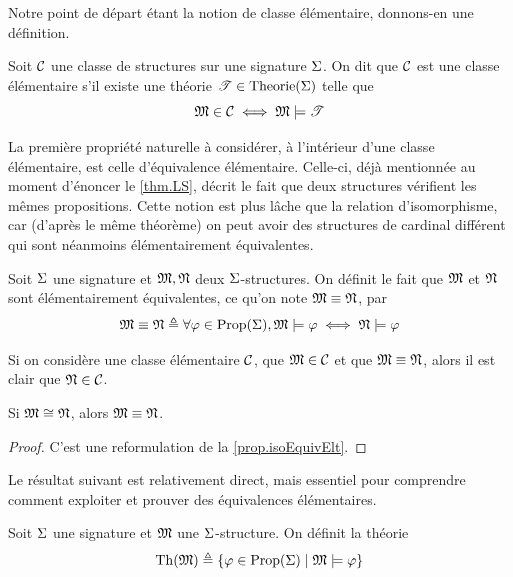 Notre point de départ étant la notion de classe élémentaire, donnons-en une
définition.

\begin{definition}
  Soit $\mathcal{C}$ une classe de structures sur une signature $\Sigma$. On dit
  que $\mathcal{C}$ est une classe élémentaire s'il existe une théorie
  $\mathscr T\in\operatorname{Theorie}(\Sigma)$ telle que
  \[\mathfrak{M}\in\mathcal{C} \iff \mathfrak{M}\models\mathscr T\]
\end{definition}

La première propriété naturelle à considérer, à l'intérieur d'une classe
élémentaire, est celle d'équivalence élémentaire. Celle-ci, déjà mentionnée au
moment d'énoncer le \cref{thm.LS}, décrit le fait que deux structures vérifient
les mêmes propositions. Cette notion est plus lâche que la relation
d'isomorphisme, car (d'après le même théorème) on peut avoir des structures de
cardinal différent qui sont néanmoins élémentairement équivalentes.

\begin{definition}
  Soit $\Sigma$ une signature et $\mathfrak{M},\mathfrak{N}$ deux $\Sigma$-structures. On
  définit le fait que $\mathfrak{M}$ et $\mathfrak{N}$ sont élémentairement équivalentes,
  ce qu'on note $\mathfrak{M}\equiv\mathfrak{N}$, par
  \[\mathfrak{M}\equiv\mathfrak{N} \triangleq \forall \varphi\in\operatorname{Prop}(\Sigma),
  \mathfrak{M}\models\varphi\iff\mathfrak{N}\models\varphi\]
\end{definition}

\begin{remark}
  Si on considère une classe élémentaire $\mathcal{C}$, que $\mathfrak{M} \in \mathcal{C}$ et
  que $\mathfrak{M}\equiv\mathfrak{N}$, alors il est clair que $\mathfrak{N}\in\mathcal{C}$.
\end{remark}

\begin{corollary}
  Si $\mathfrak{M}\cong\mathfrak{N}$, alors $\mathfrak{M}\equiv\mathfrak{N}$.
\end{corollary}

\begin{proof}
  C'est une reformulation de la \cref{prop.isoEquivElt}.
\end{proof}

Le résultat suivant est relativement direct, mais essentiel pour comprendre
comment exploiter et prouver des équivalences élémentaires.

\begin{definition}
  Soit $\Sigma$ une signature et $\mathfrak{M}$ une $\Sigma$-structure. On définit la
  théorie
  \[\operatorname{Th}(\mathfrak{M}) \triangleq \left\{ \varphi \in \operatorname{Prop}(\Sigma) \;\middle\vert\; \mathfrak{M}\models\varphi \right\}\]
\end{definition}

